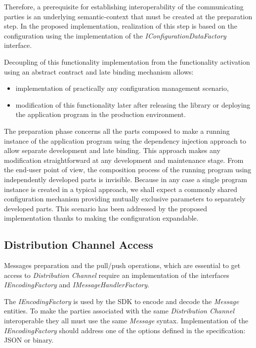 \documentclass{jacsart}
\begin{document}
Therefore, a prerequisite for establishing interoperability of the communicating parties is an underlying semantic-context that must be created at the preparation step. In the proposed implementation, realization of this step is based on the configuration using the implementation of the \emph{IConfigurationDataFactory} interface.

Decoupling of this functionality implementation from the functionality activation using an abstract contract and late binding mechanism allows:

\begin{itemize}
  \item implementation of practically any configuration management scenario,
  \item modification of this functionality later after releasing the library or deploying the application program in the production environment.
\end{itemize}

The preparation phase concerns all the parts composed to make a running instance of the application program using the dependency injection approach to allow separate development and late binding. This approach makes any modification straightforward at any development and maintenance stage. From the end-user point of view, the composition process of the running program using independently developed parts is invisible. Because in any case a single program instance is created in a typical approach, we shall expect a commonly shared configuration mechanism providing mutually exclusive parameters to separately developed parts. This scenario has been addressed by the proposed implementation thanks to making the configuration expandable.

\subsection{Distribution Channel Access}\label{distribution-channel-access}

Messages preparation and the pull/push operations, which are essential to get access to \emph{Distribution Channel} require an implementation of the interfaces \emph{IEncodingFactory} and \emph{IMessageHandlerFactory}.

The \emph{IEncodingFactory} is used by the SDK to encode and decode the \emph{Message} entities. To make the parties associated with the same \emph{Distribution Channel} interoperable they all must use the same \emph{Message} syntax. Implementation of the \emph{IEncodingFactory} should address one of the options defined in the specification: JSON or binary.
\end{document}
